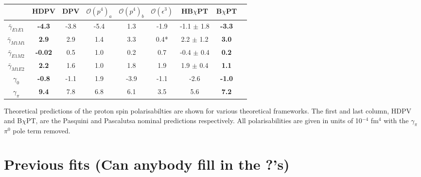 \documentclass[]{article}
\begin{document}
\begin{table}[h!]
	\centering %
	\begin{tabular}{|c|c|c|c|c|c|c|c|c|} %
		\hline %
		& \textbf{HDPV} & DPV &$\mathcal{O}(p^{4})_a$ & $\mathcal{O}(p^{4})_b$  & $\mathcal{O}(\epsilon^{3})$ & HB$\chi$PT & \textbf{B$\chi$PT} \\ [0.5ex] %
		\hline\hline %
		$\bar{\gamma}_{E1E1}$ & \textbf{-4.3}  & -3.8 & -5.4 & 1.3 & -1.9 & -1.1 $\pm$ 1.8 & \textbf{-3.3} \\ 
		$\bar{\gamma}_{M1M1}$ & \textbf{2.9}   & 2.9  & 1.4  & 3.3 & 0.4* & 2.2 $\pm$ 1.2 &\textbf{3.0} \\
		$\bar{\gamma}_{E1M2}$ & \textbf{-0.02} & 0.5  & 1.0  & 0.2 & 0.7 & -0.4 $\pm$ 0.4 & \textbf{0.2} \\
		$\bar{\gamma}_{M1E2}$ &\textbf{ 2.2 }  & 1.6  & 1.0  & 1.8 & 1.9 & 1.9 $\pm$ 0.4 & \textbf{1.1} \\
		\hline
		$\gamma_{0}$ 		  & \textbf{-0.8} &  -1.1 & 1.9  & -3.9 & -1.1  & -2.6 & \textbf{-1.0} \\
		$\gamma_{\pi}$ 		  &\textbf{9.4}  &   7.8 & 6.8  & 6.1  & 3.5  & 5.6 & \textbf{7.2} \\
		\hline %
	\end{tabular}
\end{table}

\noindent Theoretical predictions of the proton spin polarisabilties are shown for various theoretical frameworks. The first and last column, HDPV and B$\chi$PT, are the Pasquini and Pascalutsa nominal predictions respectively. All polarisabilities are given in units of 10$^{-4}$ fm$^{4}$ with the $\gamma_{\pi}$ $\pi^{0}$ pole term removed.

\section{Previous fits (Can anybody fill in the ?'s)}
\end{document}
